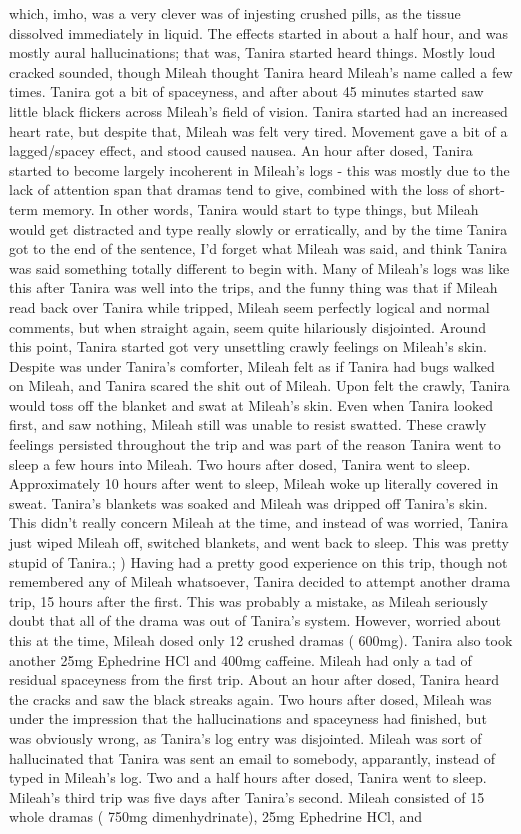 \documentclass[12pt]{book}
\begin{document}
which, imho, was a very clever was of injesting crushed pills, as the tissue dissolved immediately in liquid. The effects started in about a half hour, and was mostly aural hallucinations; that was, Tanira started heard things. Mostly loud cracked sounded, though Mileah thought Tanira heard Mileah's name called a few times. Tanira got a bit of spaceyness, and after about 45 minutes started saw little black flickers across Mileah's field of vision. Tanira started had an increased heart rate, but despite that, Mileah was felt very tired. Movement gave a bit of a lagged/spacey effect, and stood caused nausea. An hour after dosed, Tanira started to become largely incoherent in Mileah's logs - this was mostly due to the lack of attention span that dramas tend to give, combined with the loss of short-term memory. In other words, Tanira would start to type things, but Mileah would get distracted and type really slowly or erratically, and by the time Tanira got to the end of the sentence, I'd forget what Mileah was said, and think Tanira was said something totally different to begin with. Many of Mileah's logs was like this after Tanira was well into the trips, and the funny thing was that if Mileah read back over Tanira while tripped, Mileah seem perfectly logical and normal comments, but when straight again, seem quite hilariously disjointed. Around this point, Tanira started got very unsettling crawly feelings on Mileah's skin. Despite was under Tanira's comforter, Mileah felt as if Tanira had bugs walked on Mileah, and Tanira scared the shit out of Mileah. Upon felt the crawly, Tanira would toss off the blanket and swat at Mileah's skin. Even when Tanira looked first, and saw nothing, Mileah still was unable to resist swatted. These crawly feelings persisted throughout the trip and was part of the reason Tanira went to sleep a few hours into Mileah. Two hours after dosed, Tanira went to sleep. Approximately 10 hours after went to sleep, Mileah woke up literally covered in sweat. Tanira's blankets was soaked and Mileah was dripped off Tanira's skin. This didn't really concern Mileah at the time, and instead of was worried, Tanira just wiped Mileah off, switched blankets, and went back to sleep. This was pretty stupid of Tanira.; ) Having had a pretty good experience on this trip, though not remembered any of Mileah whatsoever, Tanira decided to attempt another drama trip, 15 hours after the first. This was probably a mistake, as Mileah seriously doubt that all of the drama was out of Tanira's system. However, worried about this at the time, Mileah dosed only 12 crushed dramas ( 600mg). Tanira also took another 25mg Ephedrine HCl and 400mg caffeine. Mileah had only a tad of residual spaceyness from the first trip. About an hour after dosed, Tanira heard the cracks and saw the black streaks again. Two hours after dosed, Mileah was under the impression that the hallucinations and spaceyness had finished, but was obviously wrong, as Tanira's log entry was disjointed. Mileah was sort of hallucinated that Tanira was sent an email to somebody, apparantly, instead of typed in Mileah's log. Two and a half hours after dosed, Tanira went to sleep. Mileah's third trip was five days after Tanira's second. Mileah consisted of 15 whole dramas ( 750mg dimenhydrinate), 25mg Ephedrine HCl, and 
\end{document}
